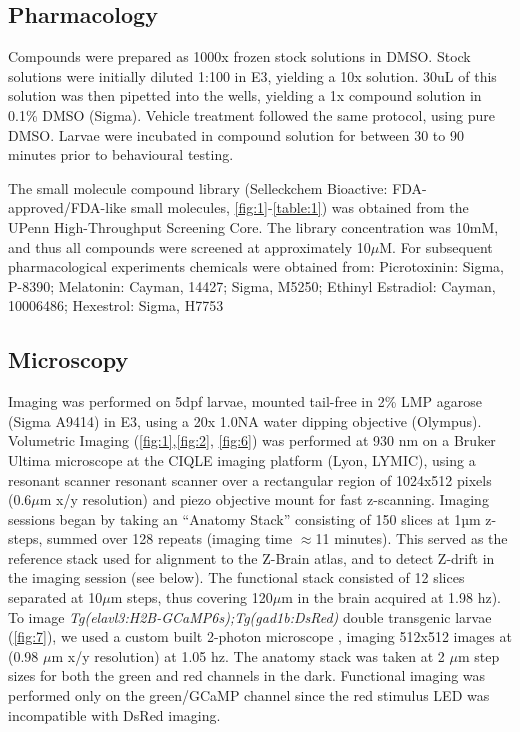 \documentclass[9pt,lineno]{RandlettLab_elife}
\begin{document}
\subsection{Pharmacology}

Compounds were prepared as 1000x frozen stock solutions in DMSO. Stock solutions were initially diluted 1:100 in E3, yielding a 10x solution. 30uL of this solution was then pipetted into the wells, yielding a 1x compound solution in 0.1\% DMSO (Sigma). Vehicle treatment followed the same protocol, using pure DMSO. Larvae were incubated in compound solution for between 30 to 90 minutes prior to behavioural testing. 

The small molecule compound library (Selleckchem Bioactive: FDA-approved/FDA-like small molecules, \autoref{fig:1}-\autoref{table:1}) was obtained from the UPenn High-Throughput Screening Core. The library concentration was 10mM, and thus all compounds were screened at approximately 10$\mu$M. For subsequent pharmacological experiments chemicals were obtained from: Picrotoxinin: Sigma, P-8390; Melatonin: Cayman, 14427; Sigma, M5250; Ethinyl Estradiol: Cayman, 10006486; Hexestrol: Sigma, H7753

\subsection{Microscopy}

Imaging was performed on 5dpf larvae, mounted tail-free in 2\% LMP agarose (Sigma A9414) in E3, using a 20x 1.0NA water dipping objective (Olympus). Volumetric Imaging (\autoref{fig:1},\autoref{fig:2}, \autoref{fig:6})  was performed at 930 nm on a Bruker Ultima microscope at the CIQLE imaging platform (Lyon, LYMIC), using a resonant scanner resonant scanner over a rectangular region of 1024x512 pixels (0.6$\mu$m x/y resolution) and piezo objective mount for fast z-scanning. Imaging sessions began by taking an “Anatomy Stack” consisting of 150 slices at 1µm z-steps, summed over 128 repeats (imaging time $\approx$11 minutes). This served as the reference stack used for alignment to the Z-Brain atlas, and to detect Z-drift in the imaging session (see below). The functional stack consisted of 12 slices separated at 10$\mu$m steps, thus covering 120$\mu$m in the brain acquired at  1.98 hz). To image \emph{Tg(elavl3:H2B-GCaMP6s);Tg(gad1b:DsRed)} double transgenic larvae (\autoref{fig:7}), we used a custom built 2-photon microscope \citep{Haesemeyer2018-ww}, imaging 512x512 images at (0.98 $\mu$m x/y resolution) at 1.05 hz. The anatomy stack was taken at 2 $\mu$m step sizes for both the green and red channels in the dark. Functional imaging was performed only on the green/GCaMP channel since the red stimulus LED was incompatible with DsRed imaging. 
\end{document}
